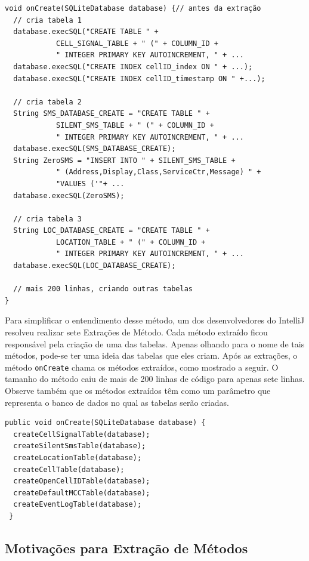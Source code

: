 \documentclass[
  11pt,
  twoside]{book}
\newcommand{\passthrough}[1]{#1}
\begin{document}
\begin{lstlisting}
void onCreate(SQLiteDatabase database) {// antes da extração
  // cria tabela 1
  database.execSQL("CREATE TABLE " +
            CELL_SIGNAL_TABLE + " (" + COLUMN_ID +
            " INTEGER PRIMARY KEY AUTOINCREMENT, " + ...
  database.execSQL("CREATE INDEX cellID_index ON " + ...);
  database.execSQL("CREATE INDEX cellID_timestamp ON " +...);

  // cria tabela 2
  String SMS_DATABASE_CREATE = "CREATE TABLE " + 
            SILENT_SMS_TABLE + " (" + COLUMN_ID +
            " INTEGER PRIMARY KEY AUTOINCREMENT, " + ...
  database.execSQL(SMS_DATABASE_CREATE);
  String ZeroSMS = "INSERT INTO " + SILENT_SMS_TABLE + 
            " (Address,Display,Class,ServiceCtr,Message) " +
            "VALUES ('"+ ...
  database.execSQL(ZeroSMS);

  // cria tabela 3
  String LOC_DATABASE_CREATE = "CREATE TABLE " +      
            LOCATION_TABLE + " (" + COLUMN_ID +
            " INTEGER PRIMARY KEY AUTOINCREMENT, " + ...
  database.execSQL(LOC_DATABASE_CREATE);

  // mais 200 linhas, criando outras tabelas
}
\end{lstlisting}

Para simplificar o entendimento desse método, um dos desenvolvedores do
IntelliJ resolveu realizar sete Extrações de Método. Cada método
extraído ficou responsável pela criação de uma das tabelas. Apenas
olhando para o nome de tais métodos, pode-se ter uma ideia das tabelas
que eles criam. Após as extrações, o método
\passthrough{\lstinline!onCreate!} chama os métodos extraídos, como
mostrado a seguir. O tamanho do método caiu de mais de 200 linhas de
código para apenas sete linhas. Observe também que os métodos extraídos
têm como um parâmetro que representa o banco de dados no qual as tabelas
serão criadas.

\begin{lstlisting}
public void onCreate(SQLiteDatabase database) { 
  createCellSignalTable(database);
  createSilentSmsTable(database);
  createLocationTable(database);
  createCellTable(database);
  createOpenCellIDTable(database);
  createDefaultMCCTable(database);
  createEventLogTable(database);
 }
\end{lstlisting}

\hypertarget{motivauxe7uxf5es-para-extrauxe7uxe3o-de-muxe9todos}{%
\subsection{Motivações para Extração de
Métodos}\label{motivauxe7uxf5es-para-extrauxe7uxe3o-de-muxe9todos}}
\end{document}
